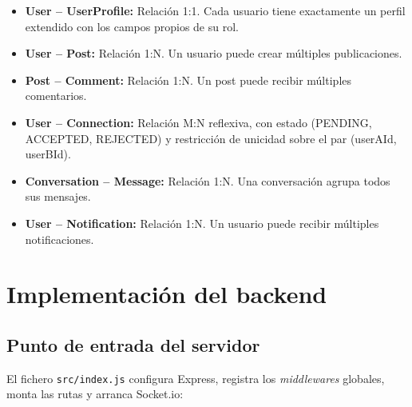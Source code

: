\documentclass[a4paper]{report}
\begin{document}
\begin{itemize}
  \item \textbf{User -- UserProfile:} Relación 1:1. Cada usuario tiene exactamente un perfil extendido con los campos propios de su rol.
  \item \textbf{User -- Post:} Relación 1:N. Un usuario puede crear múltiples publicaciones.
  \item \textbf{Post -- Comment:} Relación 1:N. Un post puede recibir múltiples comentarios.
  \item \textbf{User -- Connection:} Relación M:N reflexiva, con estado (PENDING, ACCEPTED, REJECTED) y restricción de unicidad sobre el par (userAId, userBId).
  \item \textbf{Conversation -- Message:} Relación 1:N. Una conversación agrupa todos sus mensajes.
  \item \textbf{User -- Notification:} Relación 1:N. Un usuario puede recibir múltiples notificaciones.
\end{itemize}

\section{Implementación del backend}

\subsection{Punto de entrada del servidor}

El fichero \texttt{src/index.js} configura Express, registra los \textit{middlewares} globales, monta las rutas y arranca Socket.io:
\end{document}
